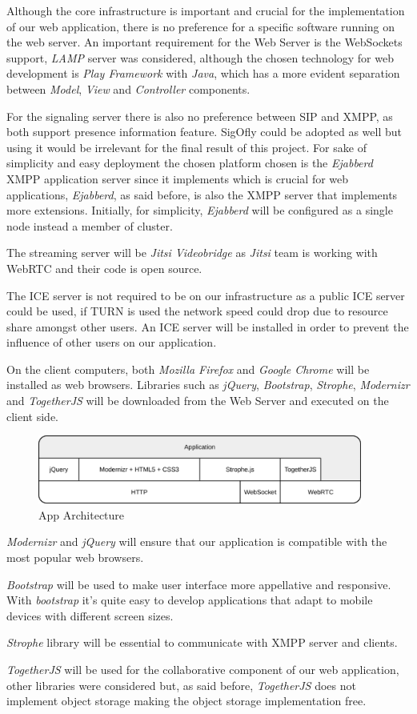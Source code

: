 Although the core infrastructure is important and crucial for the implementation of our web application, there is no preference for a specific software running on the web server. An important requirement for the Web Server is the WebSockets support, \emph{LAMP} server was considered, although the chosen technology for web development is \emph{Play Framework} with \emph{Java}, which has a more evident separation between \emph{Model}, \emph{View} and \emph{Controller} components.

For the signaling server there is also no preference between \ac{SIP} and \ac{XMPP}, as both support presence information feature. \ac{SigOfly} could be adopted as well but using it would be irrelevant for the final result of this project. For sake of simplicity and easy deployment the chosen platform chosen is the \emph{Ejabberd} \ac{XMPP} application server since it implements \cite{xep0206} which is crucial for web applications, \emph{Ejabberd}, as said before, is also the \ac{XMPP} server that implements more extensions. Initially, for simplicity, \emph{Ejabberd} will be configured as a single node instead a member of cluster. 

The streaming server will be \emph{Jitsi Videobridge} as \emph{Jitsi} team is working with \ac{WebRTC} and their code is open source.

The \ac{ICE} server is not required to be on our infrastructure as a public \ac{ICE} server could be used, if \ac{TURN} is used the network speed could drop due to resource share amongst other users. An \ac{ICE} server will be installed in order to prevent the influence of other users on our application.

On the client computers, both \emph{Mozilla Firefox} and \emph{Google Chrome} will be installed as web browsers. Libraries such as \emph{jQuery}, \emph{Bootstrap}, \emph{Strophe}, \emph{Modernizr} and \emph{TogetherJS} will be downloaded from the Web Server and executed on the client side.

\begin{figure}[H]
	\centering
	\includegraphics[width=0.95\textwidth]{figures/apparch.png}
	\caption{App Architecture}
\end{figure}

\emph{Modernizr} and \emph{jQuery} will ensure that our application is compatible with the most popular web browsers.

\emph{Bootstrap} will be used to make user interface more appellative and responsive. With \emph{bootstrap} it's quite easy to develop applications that adapt to mobile devices with different screen sizes.

\emph{Strophe} library will be essential to communicate with \ac{XMPP} server and clients.

\emph{TogetherJS} will be used for the collaborative component of our web application, other libraries were considered but, as said before, \emph{TogetherJS} does not implement object storage making the object storage implementation free.